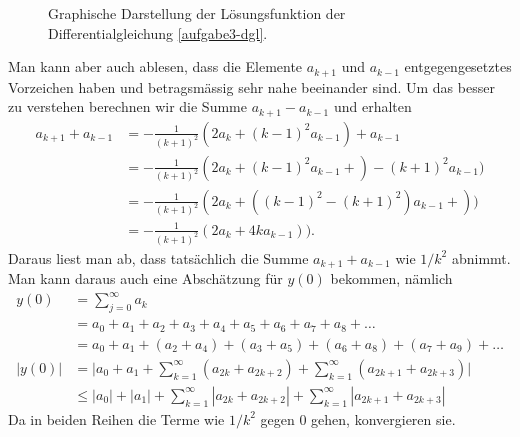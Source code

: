 \begin{loesung}
\begin{figure}
\caption{Graphische Darstellung der Lösungsfunktion der Differentialgleichung
\eqref{aufgabe3-dgl}.}
\end{figure}%
Man kann aber auch ablesen, dass die Elemente $a_{k+1}$ und $a_{k-1}$ 
entgegengesetztes Vorzeichen haben und betragsmässig sehr nahe beeinander
sind.
Um das besser zu verstehen berechnen wir die Summe $a_{k+1}-a_{k-1}$
und erhalten
\begin{align*}
a_{k+1}+a_{k-1}
&=
-\frac{1}{(k+1)^2}(2a_k + (k-1)^2 a_{k-1}) + a_{k-1}
\\
&=
-\frac{1}{(k+1)^2}(2a_k + (k-1)^2 a_{k-1}+) - (k+1)^2a_{k-1})
\\
&=
-\frac{1}{(k+1)^2}(2a_k + ((k-1)^2-(k+1)^2) a_{k-1}+))
\\
&=
-\frac{1}{(k+1)^2}(2a_k + 4ka_{k-1})).
\end{align*}
Daraus liest man ab, dass tatsächlich die Summe $a_{k+1}+a_{k-1}$
wie $1/k^2$ abnimmt.
Man kann daraus auch eine Abschätzung für $y(0)$ bekommen, nämlich
\begin{align*}
y(0)
&=
\sum_{j=0}^\infty a_k 
\\
&=
a_0 + a_1 + a_2 + a_3 + a_4+ a_5 + a_6 + a_7 + a_8 + \dots
\\
&=
a_0 + a_1 + (a_2 + a_4) + (a_3 + a_5) + (a_6 + a_8) + (a_7 + a_9)+\dots
\\
|y(0)|
&=
\biggl|
a_0 + a_1
+
\sum_{k=1}^\infty (a_{2k} + a_{2k+2})
+
\sum_{k=1}^\infty (a_{2k+1} + a_{2k+3})
\biggr|
\\
&\le
|a_0| + |a_1|
+
\sum_{k=1}^\infty |a_{2k}+a_{2k+2}|
+
\sum_{k=1}^\infty |a_{2k+1}+a_{2k+3}|
\end{align*}
Da in beiden Reihen die Terme wie $1/k^2$ gegen $0$ gehen, konvergieren
sie.
\end{loesung}
